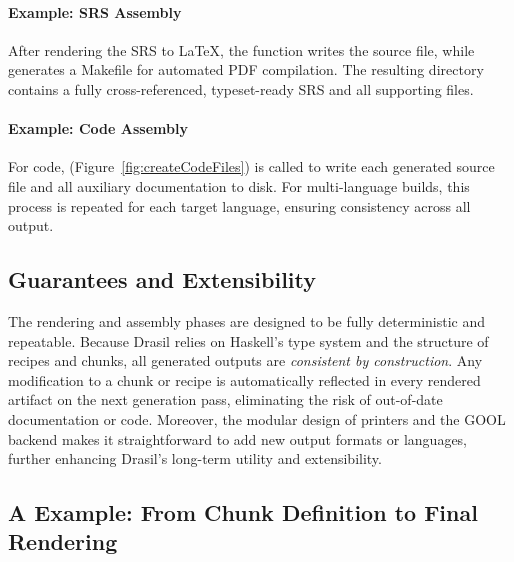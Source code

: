 \paragraph{Example: SRS Assembly}

After rendering the \gb{} SRS to \LaTeX{}, the  function 
writes the source file, while  generates a Makefile for 
automated PDF compilation. The resulting directory contains a fully 
cross-referenced, typeset-ready SRS and all supporting files.

\paragraph{Example: Code Assembly}

For code,  (Figure~\ref{fig:createCodeFiles}) is called 
to write each generated source file and all auxiliary documentation to disk. 
For multi-language builds, this process is repeated for each target language, 
ensuring consistency across all output.



\subsection{Guarantees and Extensibility}

The rendering and assembly phases are designed to be fully deterministic and 
repeatable. Because Drasil relies on Haskell's type system and the structure of 
recipes and chunks, all generated outputs are \emph{consistent by 
construction}. Any 
modification to a chunk or recipe is automatically reflected in every rendered 
artifact on the next generation pass, eliminating the risk of out-of-date 
documentation or code.
Moreover, the modular design of printers and the GOOL backend makes it 
straightforward to add new output formats or languages, further enhancing 
Drasil's long-term utility and extensibility.

\subsection{A \gb{} Example: From Chunk Definition to Final Rendering}


